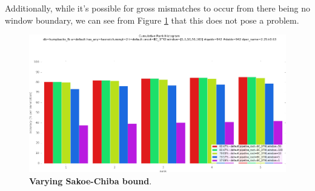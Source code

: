 Additionally, while it's possible for gross mismatches to occur from there being no window boundary, we can see from Figure \ref{fig:vary_window} that this does not pose a problem.

\begin{figure}[t]%
\centering
\includegraphics[width=1\textwidth]{../images/results/vary_window.png}
\caption{\textbf{Varying Sakoe-Chiba bound}.}
\label{fig:vary_window}
\end{figure}






